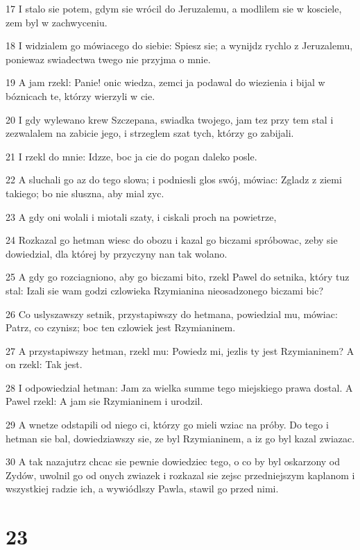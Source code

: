 \par 17 I stalo sie potem, gdym sie wrócil do Jeruzalemu, a modlilem sie w kosciele, zem byl w zachwyceniu.
\par 18 I widzialem go mówiacego do siebie: Spiesz sie; a wynijdz rychlo z Jeruzalemu, poniewaz swiadectwa twego nie przyjma o mnie.
\par 19 A jam rzekl: Panie! onic wiedza, zemci ja podawal do wiezienia i bijal w bóznicach te, którzy wierzyli w cie.
\par 20 I gdy wylewano krew Szczepana, swiadka twojego, jam tez przy tem stal i zezwalalem na zabicie jego, i strzeglem szat tych, którzy go zabijali.
\par 21 I rzekl do mnie: Idzze, boc ja cie do pogan daleko posle.
\par 22 A sluchali go az do tego slowa; i podniesli glos swój, mówiac: Zgladz z ziemi takiego; bo nie sluszna, aby mial zyc.
\par 23 A gdy oni wolali i miotali szaty, i ciskali proch na powietrze,
\par 24 Rozkazal go hetman wiesc do obozu i kazal go biczami spróbowac, zeby sie dowiedzial, dla której by przyczyny nan tak wolano.
\par 25 A gdy go rozciagniono, aby go biczami bito, rzekl Pawel do setnika, który tuz stal: Izali sie wam godzi czlowieka Rzymianina nieosadzonego biczami bic?
\par 26 Co uslyszawszy setnik, przystapiwszy do hetmana, powiedzial mu, mówiac: Patrz, co czynisz; boc ten czlowiek jest Rzymianinem.
\par 27 A przystapiwszy hetman, rzekl mu: Powiedz mi, jezlis ty jest Rzymianinem? A on rzekl: Tak jest.
\par 28 I odpowiedzial hetman: Jam za wielka summe tego miejskiego prawa dostal. A Pawel rzekl: A jam sie Rzymianinem i urodzil.
\par 29 A wnetze odstapili od niego ci, którzy go mieli wziac na próby. Do tego i hetman sie bal, dowiedziawszy sie, ze byl Rzymianinem, a iz go byl kazal zwiazac.
\par 30 A tak nazajutrz chcac sie pewnie dowiedziec tego, o co by byl oskarzony od Zydów, uwolnil go od onych zwiazek i rozkazal sie zejsc przedniejszym kaplanom i wszystkiej radzie ich, a wywiódlszy Pawla, stawil go przed nimi.

\chapter{23}

